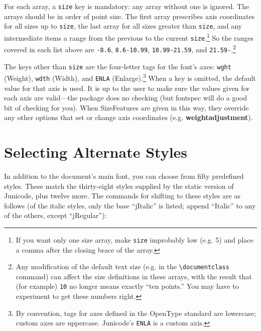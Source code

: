 \documentclass[12pt]{article}
\newcommand{\fspec}{{\sffamily fontspec}}
\newcommand{\src}[1]{{\color{BrickRed}\texttt{#1}}}
\newcommand{\option}[1]{{\color{RViolet}\textbf{#1}}}
\begin{document}
\noindent For each array, a \src{size} key is mandatory: any array without one
is ignored. The arrays should be in order of point size. The first array
prescribes axis coordinates for all sizes up to \src{size}, the last array for all sizes
greater than \src{size}, and any intermediate items a range from the previous to the
current \src{size}.\footnote{%
If you want only one size array, make \src{size} improbably low (e.g. 5) and place
a comma after the closing brace of the array.%
} So the ranges covered in each list above are \src{-8.6}, \src{8.6-10.99},
\src{10.99-21.59},
and \src{21.59-}.\footnote{Any modification of the default text size (e.g. in the
\src{\textbackslash documentclass} command) can affect the size definitions in these
arrays, with the result that (for example)
\src{10} no longer means exactly “ten points.” You may have to experiment to get these numbers
right.}

The keys other than \src{size} are the four-letter tags for the font's axes: \src{wght}
(Weight), \src{wdth} (Width), and \src{ENLA} (Enlarge).\footnote{%
By convention, tags for axes defined in the OpenType standard are lowercase; custom axes
are uppercase. Junicode’s \src{ENLA} is a custom axis.%
} When a key
is omitted, the default value for that axis is used. It is up to the user to make sure the values
given for each axis are valid---the package does no checking (but {\fspec} will do a good bit
of checking for you). When SizeFeatures are given in
this way, they override any other options that set or change axis coordinates
(e.g. \option{weightadjustment}).


\section{Selecting Alternate Styles}

In addition to the document's main font, you can choose from fifty
predefined styles. These match the thirty-eight styles supplied by the
static version of Junicode, plus twelve more. The commands for shifting to these
styles are as follows (of the italic styles, only the base “jItalic” is listed;
append “Italic” to any of the others, except “jRegular”):
\end{document}
